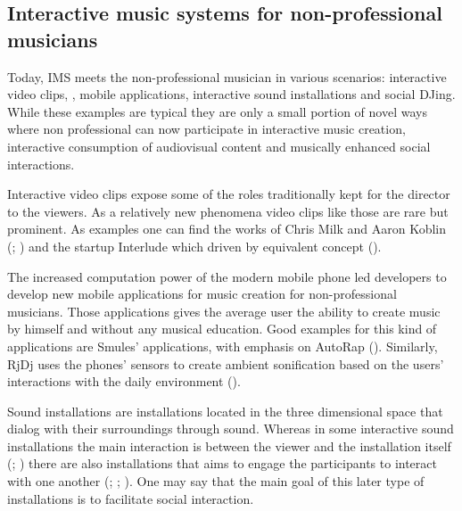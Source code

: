 \documentclass[a4paper,11pt]{article}
\begin{document}
\subsection{Interactive music systems for non-professional musicians}

Today, IMS meets the non-professional musician in various scenarios: interactive video clips, , mobile applications, interactive sound installations and social DJing.
While these examples are typical they are only a small portion of novel ways where non professional can now participate in interactive music creation, interactive consumption of audiovisual content and musically enhanced social interactions.

Interactive video clips expose some of the roles traditionally kept for the director to the viewers.
As a relatively new phenomena video clips like those are rare but prominent.
As examples one can find the works of Chris Milk and Aaron Koblin (\citeauthor{web:milk1}; \citeauthor{web:milk2}) and the startup Interlude which driven by equivalent concept (\citeauthor{web:interlude}).


The increased computation power of the modern mobile phone led developers to develop new mobile applications for music creation for non-professional musicians.
Those applications gives the average user the ability to create music by himself and without any musical education.
Good examples for this kind of applications are Smules' applications, with emphasis on AutoRap (\citeauthor{web:autorap}).
Similarly, RjDj uses the phones' sensors to create ambient sonification based on the users' interactions with the daily environment (\cite{web:rjdj})\label{rjdj}.

Sound installations are installations located in the three dimensional space that dialog with their surroundings through sound.
Whereas in some interactive sound installations the main interaction is between the viewer and the installation itself (\cite{web:visnjic}; \cite{web:cardiff01}) there are also installations that aims to engage the participants to interact with one another (\cite{eng03}; \cite{web:kirn12}; \cite{web:murray-browne13}).
One may say that the main goal of this later type of installations is to facilitate social interaction.
\end{document}
